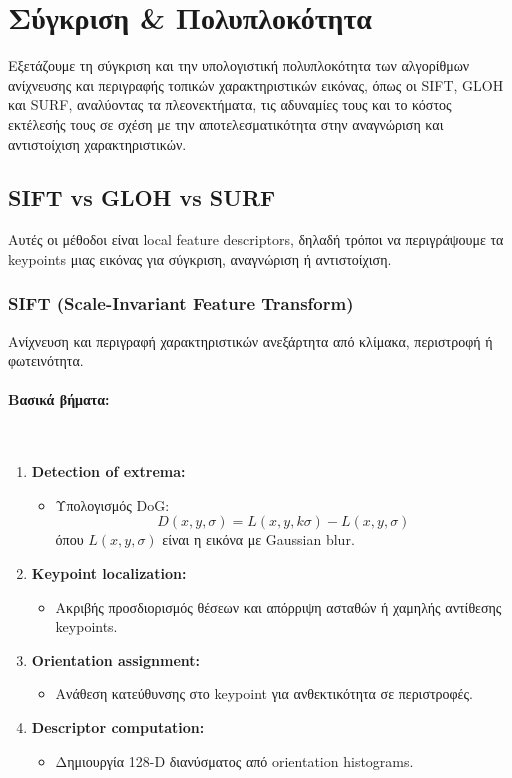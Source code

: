\documentclass[12pt]{article}
\begin{document}
\section{Σύγκριση \& Πολυπλοκότητα}
Εξετάζουμε τη σύγκριση και την υπολογιστική πολυπλοκότητα των αλγορίθμων ανίχνευσης και περιγραφής τοπικών χαρακτηριστικών εικόνας, όπως οι SIFT, GLOH και SURF, αναλύοντας τα πλεονεκτήματα,
τις αδυναμίες τους και το κόστος εκτέλεσής τους σε σχέση με την αποτελεσματικότητα στην αναγνώριση και αντιστοίχιση χαρακτηριστικών.
\subsection{SIFT vs GLOH vs SURF}
Αυτές οι μέθοδοι είναι local feature descriptors,
δηλαδή τρόποι να περιγράψουμε τα keypoints μιας εικόνας για σύγκριση, αναγνώριση ή αντιστοίχιση.
\subsubsection{SIFT (Scale-Invariant Feature Transform)}
Ανίχνευση και περιγραφή χαρακτηριστικών ανεξάρτητα από κλίμακα, περιστροφή ή φωτεινότητα.
\paragraph{Βασικά βήματα:}
\mbox{}\\
\begin{enumerate}
  \item \textbf{Detection of extrema:}
  \begin{itemize}
      \item Υπολογισμός DoG:
      \[
      D(x,y,\sigma) = L(x,y,k\sigma) - L(x,y,\sigma)
      \]
      όπου $L(x,y,\sigma)$ είναι η εικόνα με Gaussian blur.
  \end{itemize}
  
  \item \textbf{Keypoint localization:}
  \begin{itemize}
      \item Ακριβής προσδιορισμός θέσεων και απόρριψη ασταθών ή χαμηλής αντίθεσης keypoints.
  \end{itemize}
  
  \item \textbf{Orientation assignment:}
  \begin{itemize}
      \item Ανάθεση κατεύθυνσης στο keypoint για ανθεκτικότητα σε περιστροφές.
  \end{itemize}
  
  \item \textbf{Descriptor computation:}
  \begin{itemize}
      \item Δημιουργία 128-D διανύσματος από orientation histograms.
  \end{itemize}
\end{enumerate}
\end{document}
